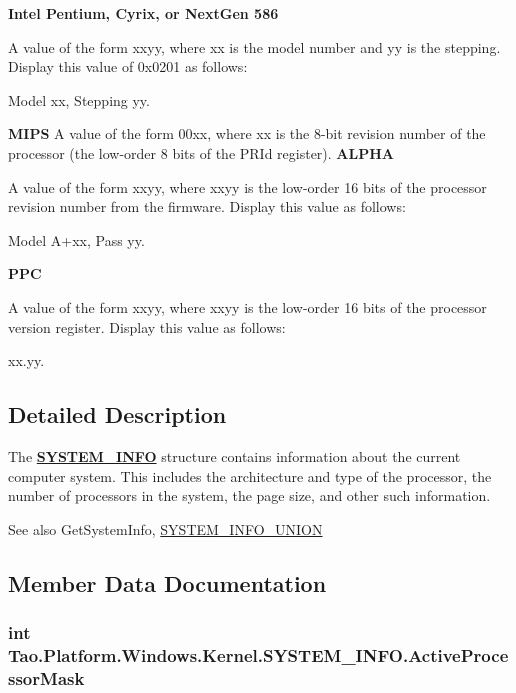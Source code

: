 \begin{DoxyCompactItemize}
\begin{DoxyCompactList}
{\bfseries Intel Pentium, Cyrix, or NextGen 586}  

A value of the form xxyy, where xx is the model number and yy is the stepping. Display this value of 0x0201 as follows: 

Model xx, Stepping yy. 

{\bfseries MIPS}  A value of the form 00xx, where xx is the 8-\/bit revision number of the processor (the low-\/order 8 bits of the PRId register).    {\bfseries ALPHA}  

A value of the form xxyy, where xxyy is the low-\/order 16 bits of the processor revision number from the firmware. Display this value as follows: 

Model A+xx, Pass yy. 

{\bfseries PPC}  

A value of the form xxyy, where xxyy is the low-\/order 16 bits of the processor version register. Display this value as follows: 

xx.yy. \item\end{DoxyCompactList}\end{DoxyCompactItemize}


\subsection{Detailed Description}
The {\bfseries \hyperlink{struct_tao_1_1_platform_1_1_windows_1_1_kernel_1_1_s_y_s_t_e_m___i_n_f_o}{SYSTEM\_\-INFO}} structure contains information about the current computer system. This includes the architecture and type of the processor, the number of processors in the system, the page size, and other such information. \begin{DoxySeeAlso}{See also}
GetSystemInfo, \hyperlink{struct_tao_1_1_platform_1_1_windows_1_1_kernel_1_1_s_y_s_t_e_m___i_n_f_o___u_n_i_o_n}{SYSTEM\_\-INFO\_\-UNION}


\end{DoxySeeAlso}


\subsection{Member Data Documentation}
\hypertarget{struct_tao_1_1_platform_1_1_windows_1_1_kernel_1_1_s_y_s_t_e_m___i_n_f_o_ab4d5f2e6af269fd08c2a05fe2b9c821b}{
\subsubsection[{ActiveProcessorMask}]{\setlength{\rightskip}{0pt plus 5cm}int {\bf Tao.Platform.Windows.Kernel.SYSTEM\_\-INFO.ActiveProcessorMask}}}
\label{struct_tao_1_1_platform_1_1_windows_1_1_kernel_1_1_s_y_s_t_e_m___i_n_f_o_ab4d5f2e6af269fd08c2a05fe2b9c821b}


